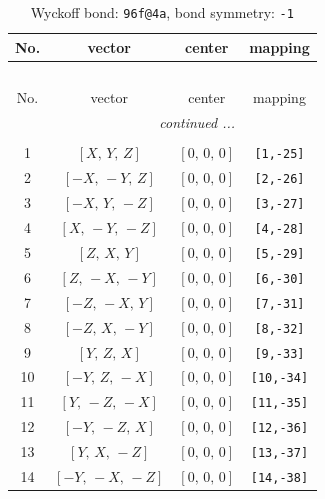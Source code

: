 \documentclass[fleqn,8pt]{jsarticle}
\begin{document}
\begin{longtable}{cccc}
\caption{Wyckoff bond: {\tt 96f@4a}, bond symmetry: {\tt -1}}
 \\
 \hline \hline
No. & vector & center & mapping \\ \hline \endfirsthead

\multicolumn{3}{l}{\tablename\ \thetable{}} \\
 \hline \hline
No. & vector & center & mapping \\ \hline \endhead

 \hline \hline
\multicolumn{3}{r}{\footnotesize\it continued ...} \\ \endfoot

 \hline \hline
\multicolumn{3}{r}{} \\ \endlastfoot

1 & $\left[ X,\, Y,\, Z \right]$ & $\left[ 0,\, 0,\, 0 \right]$ & {\tt [1,-25]} \\ \hline
2 & $\left[ - X,\, - Y,\, Z \right]$ & $\left[ 0,\, 0,\, 0 \right]$ & {\tt [2,-26]} \\ \hline
3 & $\left[ - X,\, Y,\, - Z \right]$ & $\left[ 0,\, 0,\, 0 \right]$ & {\tt [3,-27]} \\ \hline
4 & $\left[ X,\, - Y,\, - Z \right]$ & $\left[ 0,\, 0,\, 0 \right]$ & {\tt [4,-28]} \\ \hline
5 & $\left[ Z,\, X,\, Y \right]$ & $\left[ 0,\, 0,\, 0 \right]$ & {\tt [5,-29]} \\ \hline
6 & $\left[ Z,\, - X,\, - Y \right]$ & $\left[ 0,\, 0,\, 0 \right]$ & {\tt [6,-30]} \\ \hline
7 & $\left[ - Z,\, - X,\, Y \right]$ & $\left[ 0,\, 0,\, 0 \right]$ & {\tt [7,-31]} \\ \hline
8 & $\left[ - Z,\, X,\, - Y \right]$ & $\left[ 0,\, 0,\, 0 \right]$ & {\tt [8,-32]} \\ \hline
9 & $\left[ Y,\, Z,\, X \right]$ & $\left[ 0,\, 0,\, 0 \right]$ & {\tt [9,-33]} \\ \hline
10 & $\left[ - Y,\, Z,\, - X \right]$ & $\left[ 0,\, 0,\, 0 \right]$ & {\tt [10,-34]} \\ \hline
11 & $\left[ Y,\, - Z,\, - X \right]$ & $\left[ 0,\, 0,\, 0 \right]$ & {\tt [11,-35]} \\ \hline
12 & $\left[ - Y,\, - Z,\, X \right]$ & $\left[ 0,\, 0,\, 0 \right]$ & {\tt [12,-36]} \\ \hline
13 & $\left[ Y,\, X,\, - Z \right]$ & $\left[ 0,\, 0,\, 0 \right]$ & {\tt [13,-37]} \\ \hline
14 & $\left[ - Y,\, - X,\, - Z \right]$ & $\left[ 0,\, 0,\, 0 \right]$ & {\tt [14,-38]} \\ \hline

\end{longtable}
\end{document}
